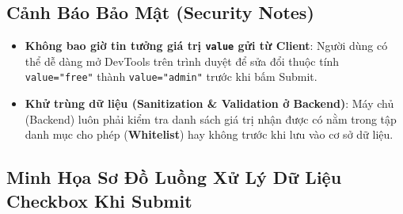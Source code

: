 \documentclass[11pt,oneside]{book}
\newcommand{\codeinline}[1]{\textcolor{accentOrange}{\texttt{#1}}}
\newcommand{\term}[1]{\textbf{\textcolor{primaryBlue}{#1}}}
\begin{document}
\subsection{Cảnh Báo Bảo Mật (Security Notes)}

\begin{warnBox}
\begin{itemize}[leftmargin=1.5em, itemsep=2pt, parsep=0pt]
    \item \textbf{Không bao giờ tin tưởng giá trị \codeinline{value} gửi từ Client}: Người dùng có thể dễ dàng mở DevTools trên trình duyệt để sửa đổi thuộc tính \codeinline{value="free"} thành \codeinline{value="admin"} trước khi bấm Submit.
    \item \textbf{Khử trùng dữ liệu (Sanitization \& Validation ở Backend)}: Máy chủ (Backend) luôn phải kiểm tra danh sách giá trị nhận được có nằm trong tập danh mục cho phép (\term{Whitelist}) hay không trước khi lưu vào cơ sở dữ liệu.
\end{itemize}
\end{warnBox}

\subsection{Minh Họa Sơ Đồ Luồng Xử Lý Dữ Liệu Checkbox Khi Submit}
\end{document}
